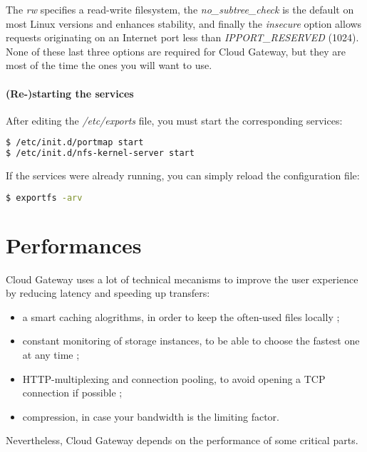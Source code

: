 \documentclass[11pt,fleqn,openany]{book} %
\begin{document}
The \textit{rw} specifies a read-write filesystem, the \textit{no\_subtree\_check} is the default on most Linux versions and enhances
stability, and finally the \textit{insecure} option allows requests originating on an Internet port less than \textit{IPPORT\_RESERVED} (1024).
None of these last three options are required for Cloud Gateway, but they are most of the time the ones you will want to use.

\subsubsection*{(Re-)starting the services}

After editing the \textit{/etc/exports} file, you must start the corresponding services:

\begin{lstlisting}[language=bash]
$ /etc/init.d/portmap start
$ /etc/init.d/nfs-kernel-server start
\end{lstlisting}

If the services were already running, you can simply reload the configuration file:

\begin{lstlisting}[language=bash]
$ exportfs -arv
\end{lstlisting}

\cleardoublepage %
\chapter{Performances}
\label{chap:performances}

Cloud Gateway uses a lot of technical mecanisms to improve the user experience by reducing latency and speeding up transfers:
\begin{itemize}
\item a smart caching alogrithms, in order to keep the often-used files locally ;
\item constant monitoring of storage instances, to be able to choose the fastest one at any time ;
\item HTTP-multiplexing and connection pooling, to avoid opening a TCP connection if possible ;
\item compression, in case your bandwidth is the limiting factor.
\end{itemize}

Nevertheless, Cloud Gateway depends on the performance of some critical parts.
\end{document}
